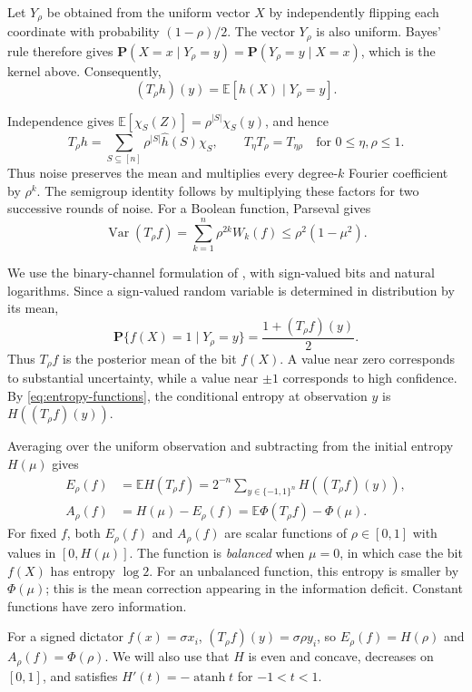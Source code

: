 \documentclass[11pt,letterpaper]{amsart}
\newcommand{\E}{\mathbb E}
\newcommand{\PP}{\mathbf P}
\newcommand{\1}{\mathbf 1}
\DeclareMathOperator{\Var}{Var}
\DeclareMathOperator{\atanh}{atanh}
\numberwithin{equation}{section}
\begin{document}
Let $Y_\rho$ be obtained from the uniform vector $X$ by
independently flipping each coordinate with probability
$(1-\rho)/2$.
The vector $Y_\rho$ is also uniform.
Bayes' rule therefore gives
$\PP(X=x\mid Y_\rho=y)=\PP(Y_\rho=y\mid X=x)$,
which is the kernel above. Consequently,
\[
 (T_\rho h)(y)=\E[h(X)\mid Y_\rho=y].
\]

Independence gives
$\E[\chi_S(Z)]=\rho^{|S|}\chi_S(y)$, and hence
\[
 T_\rho h=\sum_{S\subseteq[n]}
             \rho^{|S|}\widehat h(S)\chi_S,
 \qquad
 T_\eta T_\rho=T_{\eta\rho}
 \quad \text{for } 0\le\eta,\rho\le 1.
\]
Thus noise preserves the mean and multiplies every degree-$k$
Fourier coefficient by $\rho^k$.
The semigroup identity follows by multiplying these factors
for two successive rounds of noise.
For a Boolean function, Parseval gives
\[
 \Var(T_\rho f)
 =\sum_{k=1}^n\rho^{2k}W_k(f)
 \le\rho^2(1-\mu^2).
\]

We use the binary-channel formulation of
\cite[Section~II-A]{CourtadeKumar2014}, with sign-valued bits
and natural logarithms.
Since a sign-valued random variable is determined in distribution
by its mean,
\[
 \PP\{f(X)=1\mid Y_\rho=y\}
 =\frac{1+(T_\rho f)(y)}2.
\]
Thus $T_\rho f$ is the posterior mean of the bit $f(X)$.
A value near zero corresponds to substantial uncertainty,
while a value near $\pm1$ corresponds to high confidence.
By \eqref{eq:entropy-functions}, the conditional entropy at
observation $y$ is $H((T_\rho f)(y))$.

Averaging over the uniform observation and subtracting from
the initial entropy $H(\mu)$ gives
\begin{equation}\label{eq:posterior-entropy}
 \begin{aligned}
 E_\rho(f)
 &=\E H(T_\rho f)
   =2^{-n}\sum_{y\in\{-1,1\}^n}H((T_\rho f)(y)),\\
 A_\rho(f)
 &=H(\mu)-E_\rho(f)
   =\E\Phi(T_\rho f)-\Phi(\mu).
 \end{aligned}
\end{equation}
For fixed $f$, both $E_\rho(f)$ and $A_\rho(f)$ are scalar
functions of $\rho\in[0,1]$ with values in $[0,H(\mu)]$.
The function is \emph{balanced} when $\mu=0$, in which case
the bit $f(X)$ has entropy $\log2$.
For an unbalanced function, this entropy is smaller by
$\Phi(\mu)$; this is the mean correction appearing in the
information deficit.
Constant functions have zero information.

For a signed dictator $f(x)=\sigma x_i$,
$(T_\rho f)(y)=\sigma\rho y_i$, so
$E_\rho(f)=H(\rho)$ and $A_\rho(f)=\Phi(\rho)$.
We will also use that $H$ is even and concave, decreases on
$[0,1]$, and satisfies
$H'(t)=-\atanh t$ for $-1<t<1$.
\end{document}
